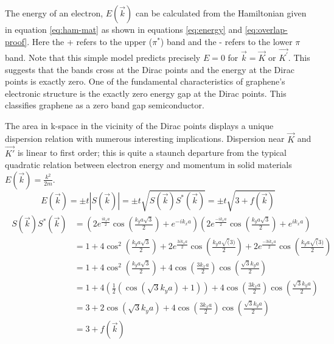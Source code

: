 The energy of an electron, $E(\vec{k})$ can be calculated from the Hamiltonian given in equation \ref{eq:ham-mat} as shown in equations \ref{eq:energy} and \ref{eq:overlap-proof}. Here the + refers to the upper ($\pi^{*}$) band and the - refers to the lower $\pi$ band. Note that this simple model predicts precisely $E = 0$ for $\vec{k} = \vec{K}$ or  $\vec{K^{'}}$. This suggests that the bands cross at the Dirac points and the energy at the Dirac points is exactly zero. One of the fundamental characteristics of graphene's electronic structure is the exactly zero energy gap at the Dirac points. This classifies graphene as a zero band gap semiconductor.

The area in k-space in the vicinity of the Dirac points displays a unique dispersion relation with numerous interesting implications. Dispersion near $\vec{K}$ and $\vec{K'}$ is linear to first order; this is quite a staunch departure from the typical quadratic relation between electron energy and momentum in solid materials $E(\vec{k}) = \frac{k^2}{2m}$.
 \begin{equation}
 \label{eq:energy}
 E(\vec{k}) = \pm t|S(\vec{k})| = \pm t \sqrt{S(\vec{k}) S^{*}(\vec{k})} = \pm t \sqrt{3 + f(\vec{k})}
 \end{equation}
 \begin{align}
 \label{eq:overlap-proof}
 \begin{split}
 S(\vec{k}) S^{*}(\vec{k}) & = (2 e^{\frac{i k_x a}{2}} \cos{( \frac{k_y a \sqrt{3}}{2})} + e^{- i k_x a})(2 e^{\frac{-i k_x a}{2}} \cos{( \frac{k_y a \sqrt{3}}{2})} + e^{i k_x a}) \\
 & = 1 + 4\cos^2{(\frac{k_y a \sqrt{3}}{2})} + 2e^{\frac{3 i k_x a}{2}}\cos{(\frac{k_y a \sqrt(3)}{2})} + 2e^{\frac{ - 3 i k_x a}{2}}\cos{(\frac{k_y a \sqrt(3)}{2})}\\
 & = 1 + 4\cos^2{(\frac{k_y a \sqrt{3}}{2})}  + 4\cos{(\frac{3 k_x a}{2})}\cos{(\frac{\sqrt{3} k_y a}{2})}\\
 & = 1 + 4(\frac{1}{2}(\cos{(\sqrt{3} k_y a)} +1)) + 4\cos{(\frac{3 k_x a}{2})}\cos{(\frac{\sqrt{3} k_y a}{2})}\\
 & = 3 + 2\cos{(\sqrt{3} k_y a)} + 4\cos{(\frac{3 k_x a}{2})}\cos{(\frac{\sqrt{3} k_y a}{2})} \\
 & = 3 + 	f(\vec{k})
 \end{split}
 \end{align}

